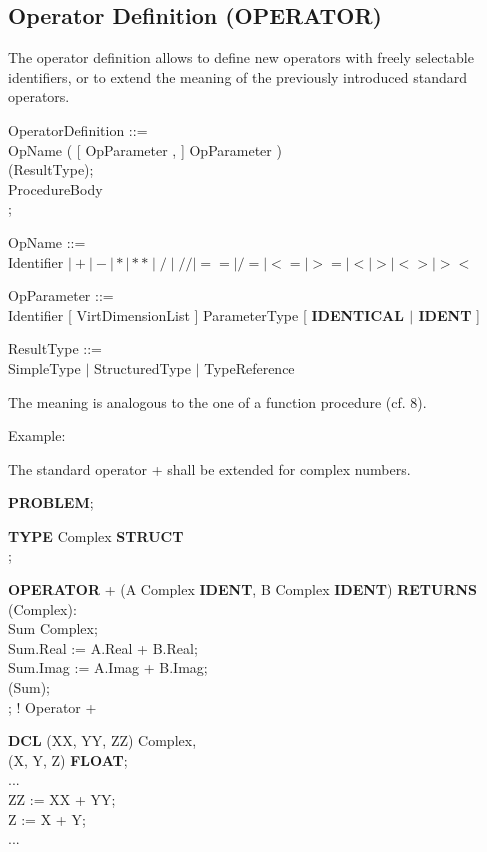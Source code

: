 \begin{removed}
\section{Operator Definition (OPERATOR)}   %

The operator definition allows to define new operators with freely
selectable identifiers, or to extend the meaning of the previously
introduced standard operators.

OperatorDefinition ::=\\
 OpName ( [ OpParameter , ] OpParameter )\\
 (ResultType);\\
\x ProcedureBody\\
;

OpName ::=\\
\x Identifier $\mid + \mid - \mid * \mid ** \mid / \mid // \mid == \mid /= \mid <= \mid >= \mid < \mid > \mid <> \mid ><$

OpParameter ::=\\
\x Identifier [ VirtDimensionList ] ParameterType [ {\bf IDENTICAL $\mid$ IDENT} ]

ResultType ::=\\
\x SimpleType $\mid$ StructuredType $\mid$ TypeReference

The meaning is analogous to the one of a function procedure (cf. 8).


Example:

The standard operator + shall be extended for complex numbers.

{\bf PROBLEM};

{\bf TYPE} Complex {\bf STRUCT}\\
;

{\bf OPERATOR} + (A Complex {\bf IDENT}, B Complex {\bf IDENT}) {\bf RETURNS} (Complex):\\
 Sum Complex;\\
\x Sum.Real := A.Real + B.Real;\\
\x Sum.Imag := A.Imag + B.Imag;\\
 (Sum);\\
; ! Operator +

{\bf DCL} (XX, YY, ZZ) Complex,\\
\x (X, Y, Z) {\bf FLOAT};\\
...\\
ZZ := XX + YY;\\
Z := X + Y;\\
...


\end{removed}
